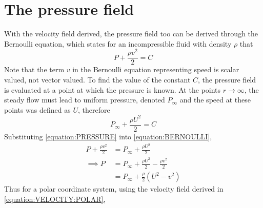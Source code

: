 \section{The pressure field}
With the velocity field derived, the pressure field too can be derived through the Bernoulli equation,
which states for an incompressible fluid with density $\rho$ that
\begin{equation}\label{equation:BERNOULLI}
    P+\frac{\rho v^2}{2}=C
\end{equation}
Note that the term $v$ in the Bernoulli equation representing speed is scalar valued, not vector valued.
To find the value of the constant $C$, the pressure field is evaluated at a point at which the pressure
is known. At the points $r\rightarrow\infty$, the steady flow must lead to uniform pressure, denoted
$P_\infty$ and the speed at these points was defined as $U$,
therefore
\begin{equation}\label{equation:PRESSURE}
    P_\infty+\frac{\rho U^2}{2}=C
\end{equation}
Substituting \eqref{equation:PRESSURE} into \eqref{equation:BERNOULLI},
\begin{align*}
    P+\frac{\rho v^2}{2}&=P_\infty+\frac{\rho U^2}{2}\\
    \implies P&=P_\infty+\frac{\rho U^2}{2}-\frac{\rho v^2}{2}\\
    &=P_\infty+\frac{\rho}{2}\left(U^2-v^2\right)
\end{align*}
Thus for a polar coordinate system, using the velocity field derived in \eqref{equation:VELOCITY:POLAR},
